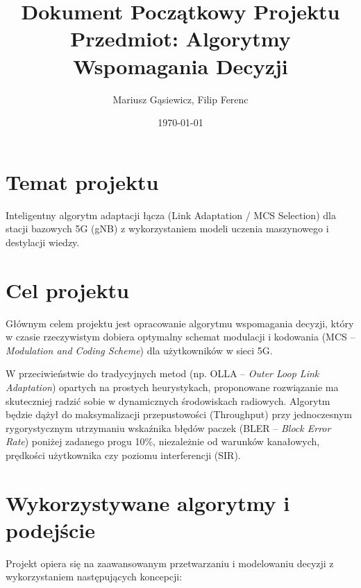 \documentclass[12pt, a4paper]{article}
\title{\textbf{Dokument Początkowy Projektu}\\ \large Przedmiot: Algorytmy Wspomagania Decyzji}
\author{Mariusz Gąsiewicz, Filip Ferenc}
\date{\today}
\begin{document}
\maketitle

\section{Temat projektu}
Inteligentny algorytm adaptacji łącza (Link Adaptation / MCS Selection) dla stacji bazowych 5G (gNB) z wykorzystaniem modeli uczenia maszynowego i destylacji wiedzy.

\section{Cel projektu}
Głównym celem projektu jest opracowanie algorytmu wspomagania decyzji, który w czasie rzeczywistym dobiera optymalny schemat modulacji i kodowania (MCS -- \textit{Modulation and Coding Scheme}) dla użytkowników w sieci 5G. 

W przeciwieństwie do tradycyjnych metod (np. OLLA -- \textit{Outer Loop Link Adaptation}) opartych na prostych heurystykach, proponowane rozwiązanie ma skuteczniej radzić sobie w dynamicznych środowiskach radiowych. Algorytm będzie dążył do maksymalizacji przepustowości (Throughput) przy jednoczesnym rygorystycznym utrzymaniu wskaźnika błędów paczek (BLER -- \textit{Block Error Rate}) poniżej zadanego progu 10\%, niezależnie od warunków kanałowych, prędkości użytkownika czy poziomu interferencji (SIR).

\section{Wykorzystywane algorytmy i podejście}
Projekt opiera się na zaawansowanym przetwarzaniu i modelowaniu decyzji z wykorzystaniem następujących koncepcji:
\end{document}
